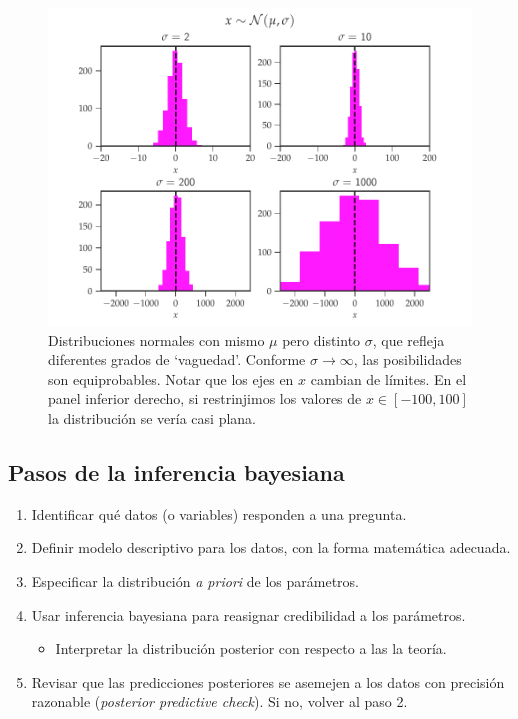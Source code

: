\documentclass{scrartcl}
\begin{document}
	\begin{figure}[t!]
		\centering
		\includegraphics[width=\textwidth]{Figure_1.pdf}
		\caption{Distribuciones normales con mismo $\mu$ pero distinto $\sigma$, que refleja diferentes grados de `vaguedad'. Conforme $\sigma \rightarrow \infty$, las posibilidades son equiprobables. Notar que los ejes en $x$ cambian de límites. En el panel inferior derecho, si restrinjimos los valores de $x \in [-100,100]$ la distribución se vería casi plana.}
		\label{fig:fig1}
	\end{figure}
	
	\subsection{Pasos de la inferencia bayesiana}
	
	\begin{tcolorbox}[colback=red!5!white,colframe=red!75!black]
		\begin{enumerate}
			\item Identificar qué datos (o variables) responden a una pregunta. 
			\item Definir modelo descriptivo para los datos, con la forma matemática adecuada.
			\item Especificar la distribución \textit{a priori} de los parámetros. 
			\item Usar inferencia bayesiana para reasignar credibilidad a los parámetros. 
			\begin{itemize}
				\item Interpretar la distribución posterior con respecto a las la teoría.
			\end{itemize}
			\item Revisar que las predicciones posteriores se asemejen a los datos con precisión razonable (\textit{posterior predictive check}). Si no, volver al paso 2.
		\end{enumerate}
	\end{tcolorbox}
	
\end{document}
